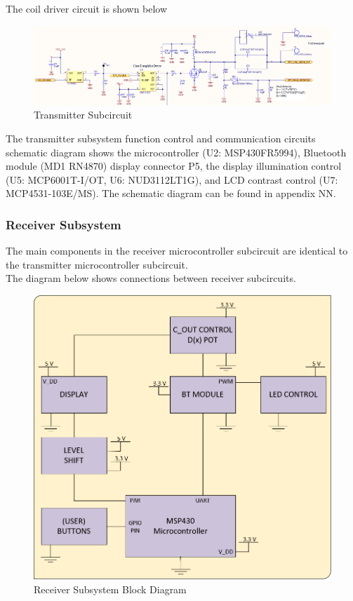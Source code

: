 \documentclass[12pt]{article}
\begin{document}
\indent
The coil driver circuit is shown below 
\hfill

\begin{figure}[h!]
\centering
\includegraphics[width=0.925\linewidth]{tx_dc_rf_driver}
\caption{Transmitter Subcircuit}
\end{figure}

\indent
The transmitter subsystem function control and communication circuits schematic diagram shows the microcontroller (U2: MSP430FR5994), Bluetooth module (MD1 RN4870) display connector P5, the display illumination control (U5: MCP6001T-I/OT, U6: NUD3112LT1G), and LCD contrast control (U7: MCP4531-103E/MS). The schematic diagram can be found in appendix NN.

\pagebreak

\subsubsection{Receiver Subsystem} The main components in the receiver microcontroller subcircuit are identical to the transmitter microcontroller subcircuit.\\

\indent
The diagram below shows connections between receiver subcircuits. 
\hfill

\begin{figure}[h!]
\centering
\includegraphics[width=0.88\linewidth]{controller_block.png}
\caption{Receiver Subsystem Block Diagram}
\end{figure}
\end{document}
